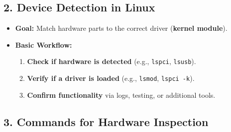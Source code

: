 \documentclass[a4paper]{report}
\begin{document}
\subsection*{2. Device Detection in Linux}
\begin{itemize}
    \item \textbf{Goal:} Match hardware parts to the correct driver (\textbf{kernel module}).
    \item \textbf{Basic Workflow:}
    \begin{enumerate}
        \item \textbf{Check if hardware is detected} (e.g., \texttt{lspci}, \texttt{lsusb}).
        \item \textbf{Verify if a driver is loaded} (e.g., \texttt{lsmod}, \texttt{lspci -k}).
        \item \textbf{Confirm functionality} via logs, testing, or additional tools.
    \end{enumerate}
\end{itemize}

\subsection*{3. Commands for Hardware Inspection}
\end{document}

